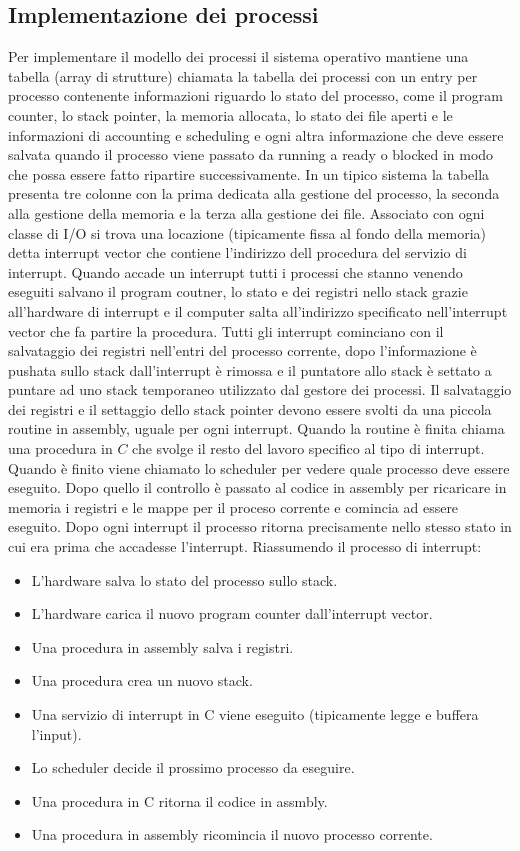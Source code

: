 \subsection{Implementazione dei processi}
Per implementare il modello dei processi il sistema operativo mantiene una tabella (array di strutture) chiamata la tabella dei processi con un entry per processo contenente
informazioni riguardo lo stato del processo, come il program counter, lo stack pointer, la memoria allocata, lo stato dei file aperti e le informazioni di accounting e scheduling e
ogni altra informazione che deve essere salvata quando il processo viene passato da running a ready o blocked in modo che possa essere fatto ripartire successivamente. In un tipico
sistema la tabella presenta tre colonne con la prima dedicata alla gestione del processo, la seconda alla gestione della memoria e la terza alla gestione dei file. Associato con ogni
classe di I/O si trova una locazione (tipicamente fissa al fondo della memoria) detta interrupt vector che contiene l'indirizzo dell procedura del servizio di interrupt. Quando accade
un interrupt tutti i processi che stanno venendo eseguiti salvano il program coutner, lo stato e dei registri nello stack grazie all'hardware di interrupt e il computer salta
all'indirizzo specificato nell'interrupt vector che fa partire la procedura. Tutti gli interrupt cominciano con il salvataggio dei registri nell'entri del processo corrente, dopo
l'informazione \`e pushata sullo stack dall'interrupt \`e rimossa e il puntatore allo stack \`e settato a puntare ad uno stack temporaneo utilizzato dal gestore dei processi. Il
salvataggio dei registri e il settaggio dello stack pointer devono essere svolti da una piccola routine in assembly, uguale per ogni interrupt. Quando la routine \`e finita chiama una
procedura in $C$ che svolge il resto del lavoro specifico al tipo di interrupt. Quando \`e finito viene chiamato lo scheduler per vedere quale processo deve essere eseguito. Dopo
quello il controllo \`e passato al codice in assembly per ricaricare in memoria i registri e le mappe per il proceso corrente e comincia ad essere eseguito. Dopo ogni interrupt il
processo ritorna precisamente nello stesso stato in cui era prima che accadesse l'interrupt. Riassumendo il processo di interrupt:
\begin{itemize}
	\item L'hardware salva lo stato del processo sullo stack.
	\item L'hardware carica il nuovo program counter dall'interrupt vector.
	\item Una procedura in assembly salva i registri.
	\item Una procedura crea un nuovo stack.
	\item Una servizio di interrupt in C viene eseguito (tipicamente legge e buffera l'input).
	\item Lo scheduler decide il prossimo processo da eseguire.
	\item Una procedura in C ritorna il codice in assmbly.
	\item Una procedura in assembly ricomincia il nuovo processo corrente.
\end{itemize}
